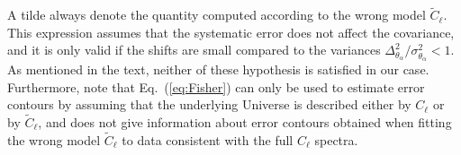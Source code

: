 A tilde always denote the quantity computed according to the wrong model $\widetilde{C}_{\ell}$.
This expression assumes that the systematic error does not affect the covariance, and it is only valid if the shifts are small compared to the variances $\Delta^2_{\theta_{\alpha}}/\sigma^2_{\theta_{\alpha}}<1$.
As mentioned in the text, neither of these hypothesis is satisfied in our case.
Furthermore, note that Eq.~(\ref{eq:Fisher}) can only be used to estimate error contours by assuming that the underlying Universe is described either by $C_{\ell}$ or by $\tilde{C}_{\ell}$, and does not give information about error contours obtained when  fitting the wrong model $\tilde{C}_{\ell}$ to data consistent with the full $C_{\ell}$ spectra.

